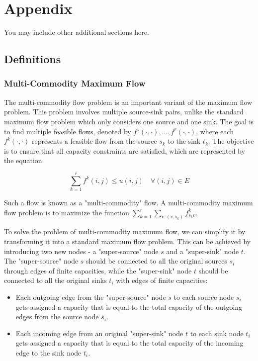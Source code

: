\documentclass{article} %
\theoremstyle{bfnote}
\begin{document}



\pagebreak
\appendix
\section{Appendix}
You may include other additional sections here.

\subsection{Definitions}

\subsubsection{Multi-Commodity Maximum Flow}
The multi-commodity flow problem is an important variant of the maximum flow problem. This problem involves multiple source-sink pairs, unlike the standard maximum flow problem which only considers one source and one sink. The goal is to find multiple feasible flows, denoted by $f^1(\cdot, \cdot), \ldots, f^r(\cdot, \cdot)$, where each $f^k(\cdot, \cdot)$ represents a feasible flow from the source $s_k$ to the sink $t_k$. The objective is to ensure that all capacity constraints are satisfied, which are represented by the equation:

\begin{equation*}
	\sum_{k=1}^r f^k(i, j) \leq u(i, j) \quad \forall(i, j) \in E
\end{equation*}

Such a flow is known as a "multi-commodity" flow. A multi-commodity maximum flow problem is to maximize the function $\sum_{k=1}^r \sum_{v:(v, s_k)} f^k_{s_k v}$.


To solve the problem of multi-commodity maximum flow, we can simplify it by transforming it into a standard maximum flow problem. This can be achieved by introducing two new nodes - a "super-source" node $s$ and a "super-sink" node $t$. The "super-source" node $s$ should be connected to all the original sources $s_i$ through edges of finite capacities, while the "super-sink" node $t$ should be connected to all the original sinks $t_i$ with edges of finite capacities:

\begin{itemize}
	\item Each outgoing edge from the "super-source" node $s$ to each source
	node $s_i$ gets assigned a capacity that is equal to the total capacity of the
	outgoing edges from the source node $s_i$.
	
	\item Each incoming edge from an original "super-sink" node $t$ to each sink
	node $t_i$ gets assigned a capacity that is equal to the total capacity of the
	incoming edge to the sink node $t_i$.
\end{itemize}
\end{document}
